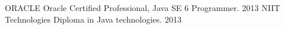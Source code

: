 \begin{cvhonors}
  \cvhonor
    {ORACLE}
    {Oracle Certified Professional, Java SE 6 Programmer. }
    {}
    {2013}
  \cvhonor
    {NIIT Technologies}
    {Diploma in Java technologies.}
    {}
    {2013}
\end{cvhonors}
